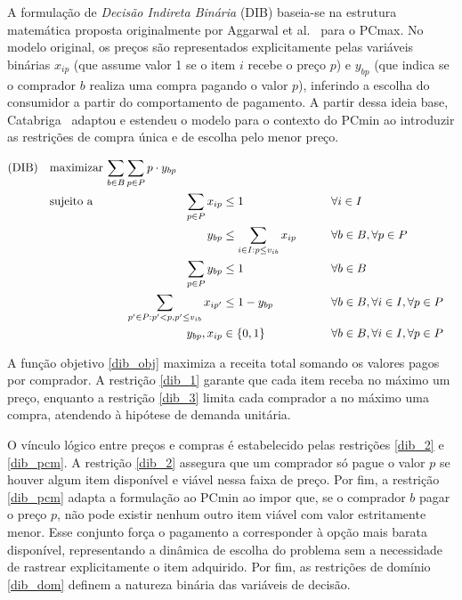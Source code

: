 A formulação de \emph{Decisão Indireta Binária} (DIB) baseia-se na estrutura matemática proposta originalmente por Aggarwal et al.~\cite{aggarwal2004} para o PCmax. No modelo original, os preços são representados explicitamente pelas variáveis binárias $x_{ip}$ (que assume valor 1 se o item $i$ recebe o preço $p$) e $y_{bp}$ (que indica se o comprador $b$ realiza uma compra pagando o valor $p$), inferindo a escolha do consumidor a partir do comportamento de pagamento. A partir dessa ideia base, Catabriga~\cite{catabriga2025} adaptou e estendeu o modelo para o contexto do PCmin ao introduzir as restrições de compra única e de escolha pelo menor preço.

\begin{alignat}{4}
\mathrm{(DIB)} \quad & \omit\rlap{maximizar $\displaystyle \sum_{b \in B} \sum_{p \in P} p \cdot y_{bp}$} \label{dib_obj}\\
& \text{sujeito a} && \quad & \sum_{p \in P} x_{ip} &\leq 1 && \forall i \in I \label{dib_1}\\
&                  &&       & y_{bp} &\leq \sum_{i \in I: p \leq v_{ib}} x_{ip} &\qquad & \forall b \in B, \forall p \in P \label{dib_2}\\
&                  &&       & \sum_{p \in P} y_{bp} &\leq 1 && \forall b \in B \label{dib_3}\\
&                  &&       & \sum_{p' \in P: p' < p, p' \leq v_{ib}} x_{ip'} &\leq 1 - y_{bp} && \forall b \in B, \forall i \in I, \forall p \in P \label{dib_pcm}\\
&                  &&       & y_{bp}, x_{ip} &\in \{0, 1\} && \forall b \in B, \forall i \in I, \forall p \in P \label{dib_dom}
\end{alignat}

A função objetivo \eqref{dib_obj} maximiza a receita total somando os valores pagos por comprador. A restrição \eqref{dib_1} garante que cada item receba no máximo um preço, enquanto a restrição \eqref{dib_3} limita cada comprador a no máximo uma compra, atendendo à hipótese de demanda unitária.

O vínculo lógico entre preços e compras é estabelecido pelas restrições \eqref{dib_2} e \eqref{dib_pcm}. A restrição \eqref{dib_2} assegura que um comprador só pague o valor $p$ se houver algum item disponível e viável nessa faixa de preço. Por fim, a restrição \eqref{dib_pcm} adapta a formulação ao PCmin ao impor que, se o comprador $b$ pagar o preço $p$, não pode existir nenhum outro item viável com valor estritamente menor. Esse conjunto força o pagamento a corresponder à opção mais barata disponível, representando a dinâmica de escolha do problema sem a necessidade de rastrear explicitamente o item adquirido. Por fim, as restrições de domínio \eqref{dib_dom} definem a natureza binária das variáveis de decisão. 

